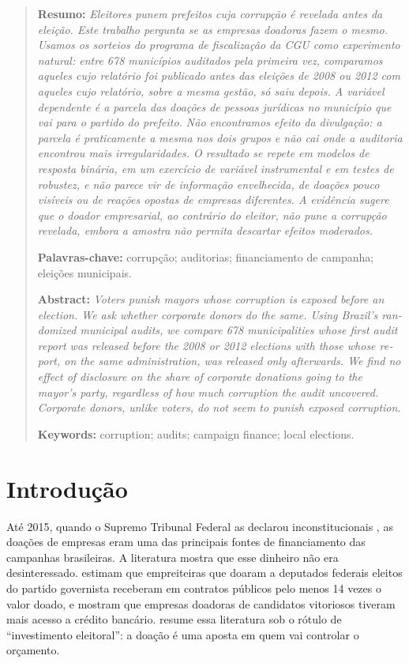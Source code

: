 \vspace{2pt}
\begin{quote}
\small\noindent\textbf{Resumo:} \textit{Eleitores punem prefeitos cuja corrupção é revelada antes da
eleição. Este trabalho pergunta se as empresas doadoras fazem o mesmo. Usamos os sorteios do programa de
fiscalização da CGU como experimento natural: entre 678 municípios auditados pela primeira vez, comparamos
aqueles cujo relatório foi publicado antes das eleições de 2008 ou 2012 com aqueles cujo relatório, sobre
a mesma gestão, só saiu depois. A variável dependente é a parcela das doações de pessoas jurídicas no
município que vai para o partido do prefeito. Não encontramos efeito da divulgação: a parcela é
praticamente a mesma nos dois grupos e não cai onde a auditoria encontrou mais irregularidades. O
resultado se repete em modelos de resposta binária, em um exercício de variável instrumental e em testes
de robustez, e não parece vir de informação envelhecida, de doações pouco visíveis ou de reações opostas
de empresas diferentes. A evidência sugere que o doador empresarial, ao contrário do eleitor, não pune a
corrupção revelada, embora a amostra não permita descartar efeitos moderados.}

\smallskip
\noindent\textbf{Palavras-chave:} corrupção; auditorias; financiamento de campanha; eleições municipais.

\medskip
\noindent\textbf{Abstract:} \textit{\foreignlanguage{english}{Voters punish mayors whose corruption is
exposed before an election. We ask whether corporate donors do the same. Using Brazil's randomized
municipal audits, we compare 678 municipalities whose first audit report was released before the 2008 or
2012 elections with those whose report, on the same administration, was released only afterwards. We find
no effect of disclosure on the share of corporate donations going to the mayor's party, regardless of how
much corruption the audit uncovered. Corporate donors, unlike voters, do not seem to punish exposed
corruption.}}

\smallskip
\noindent\textbf{Keywords:} \foreignlanguage{english}{corruption; audits; campaign finance; local elections.}
\end{quote}

\section{Introdução}

Até 2015, quando o Supremo Tribunal Federal as declarou inconstitucionais \cite{stf2015}, as doações de
empresas eram uma das principais fontes de financiamento das campanhas brasileiras. A literatura mostra que
esse dinheiro não era desinteressado.  estimam que empreiteiras que doaram a deputados
federais eleitos do partido governista receberam em contratos públicos pelo menos 14 vezes o valor doado, e
 mostram que empresas doadoras de candidatos vitoriosos tiveram mais acesso a
crédito bancário.  resume essa literatura sob o rótulo de ``investimento
eleitoral'': a doação é uma aposta em quem vai controlar o orçamento.

